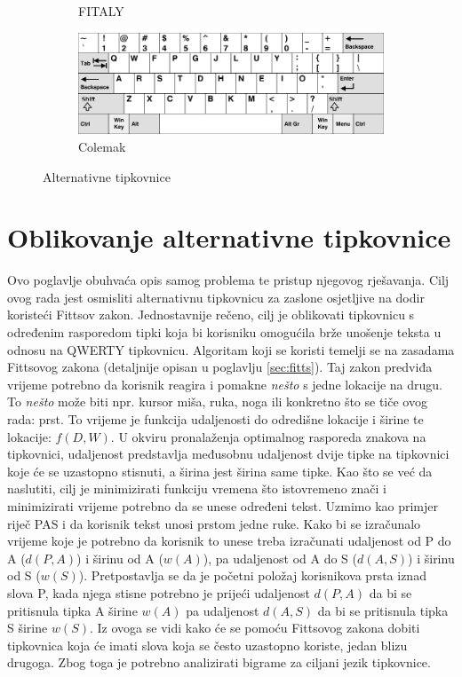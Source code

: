 \documentclass[times, utf8, zavrsni, numeric]{fer}
\begin{document}
\begin{figure}[htb]
\begin{subfigure}[b]{0.45\textwidth}
    \caption{FITALY}
    \label{fig:fitaly}
  \end{subfigure}
  \hfill
  \begin{subfigure}[b]{0.45\textwidth}
    \includegraphics[width=\textwidth]{img/colemak.png}
    \caption{Colemak}
    \label{fig:colemak}
  \end{subfigure}
  \caption{Alternativne tipkovnice}
\end{figure}

\chapter{Oblikovanje alternativne tipkovnice}
Ovo poglavlje obuhvaća opis samog problema te pristup njegovog rješavanja. Cilj ovog rada jest osmisliti alternativnu tipkovnicu za zaslone osjetljive na dodir koristeći Fittsov zakon. Jednostavnije rečeno, cilj je oblikovati tipkovnicu s određenim rasporedom tipki koja bi korisniku omogućila brže unošenje teksta u odnosu na QWERTY tipkovnicu. Algoritam koji se koristi temelji se na zasadama Fittsovog zakona (detaljnije opisan u poglavlju \ref{sec:fitts}). Taj zakon predviđa vrijeme potrebno da korisnik reagira i pomakne \emph{nešto} s jedne lokacije na drugu. To \emph{nešto} može biti npr. kursor miša, ruka, noga ili konkretno što se tiče ovog rada: prst. To vrijeme je funkcija udaljenosti do odredišne lokacije i širine te lokacije: $f(D,W)$. U okviru pronalaženja optimalnog rasporeda znakova na tipkovnici, udaljenost predstavlja međusobnu udaljenost dvije tipke na tipkovnici koje će se uzastopno stisnuti, a širina jest širina same tipke. Kao što se već da naslutiti, cilj je minimizirati funkciju vremena što istovremeno znači i minimizirati vrijeme potrebno da se unese određeni tekst. Uzmimo kao primjer riječ PAS i da korisnik tekst unosi prstom jedne ruke. Kako bi se izračunalo vrijeme koje je potrebno da korisnik to unese treba izračunati udaljenost od P do A ($d(P,A)$) i širinu od A ($w(A)$), pa udaljenost od A do S ($d(A,S)$) i širinu od S ($w(S)$). Pretpostavlja se da je početni položaj korisnikova prsta iznad slova P, kada njega stisne potrebno je prijeći udaljenost $d(P,A)$ da bi se pritisnula tipka A širine $w(A)$ pa udaljenost $d(A,S)$ da bi se pritisnula tipka S širine $w(S)$. Iz ovoga se vidi kako će se pomoću Fittsovog zakona dobiti tipkovnica koja će imati slova koja se često uzastopno koriste, jedan blizu drugoga. Zbog toga je potrebno analizirati bigrame za ciljani jezik tipkovnice.
\end{document}

